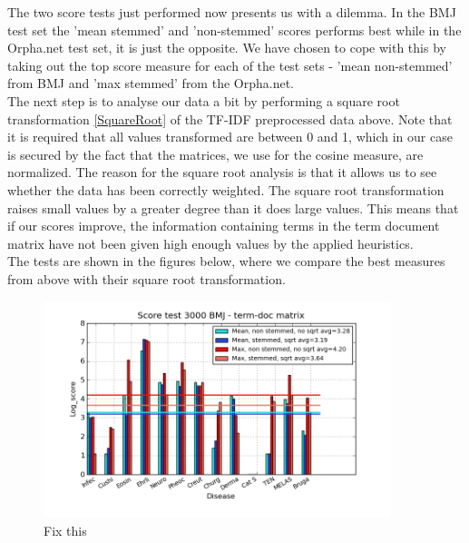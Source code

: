 The two score tests just performed now presents us with a dilemma. In the BMJ test set the 'mean stemmed' and 'non-stemmed' scores performs best while in the Orpha.net test set, it is just the opposite. We have chosen to cope with this by taking out the top score measure for each of the test sets - 'mean non-stemmed' from BMJ and 'max stemmed' from the Orpha.net. \\

The next step is to analyse our data a bit by performing a square root transformation \ref{SquareRoot} of the TF-IDF preprocessed data above. Note that it is required that all values transformed are between 0 and 1, which in our case is secured by the fact that the matrices, we use for the cosine measure, are normalized. The reason for the square root analysis is that it allows us to see whether the data has been correctly weighted. The square root transformation raises small values by a greater degree than it does large values. This means that if our scores improve, the information containing terms in the term document matrix have not been given high enough values by the applied heuristics. \\

The tests are shown in the figures below, where we compare the best measures from above with their square root transformation.

\begin{figure}[H]
        \begin{center}
          \includegraphics[width=0.9\textwidth]{barcharts/termDoc_bmj_hist_3000_ns_mea_ns_mea_sqr_s_max_s_max_sqr.png}
        \end{center}
        \caption{Fix this}
        \label{termDoc_bmj_hist_3000_ns_mea_ns_mea_sqr_s_max_s_max_sqr}
\end{figure}

